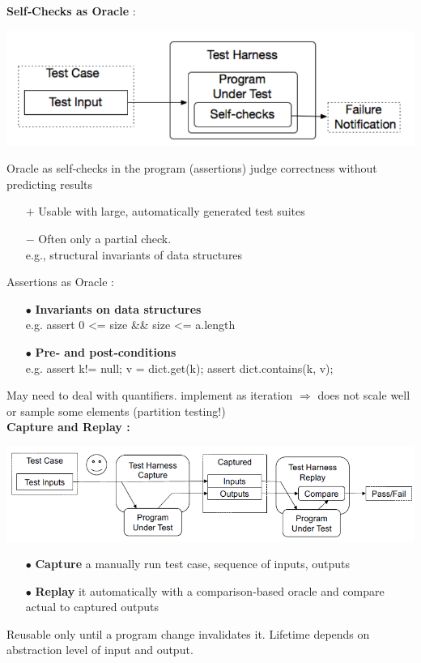 \documentclass{article}
\begin{document}
\begin{multicols}{2}
\noindent \textbf{Self‐Checks
as
Oracle} :


\begin{center}
    \includegraphics[scale=0.4]{image/51.PNG}
\end{center}


\noindent Oracle as self‐checks in the program (assertions) judge correctness without predicting results
\begin{itemize}
    \item [$+$]Usable with large, automatically generated test suites
    \item [$-$]Often only a partial check. \\
    e.g., structural invariants of data structures\\
\end{itemize}

\noindent Assertions as Oracle :
\begin{itemize}
    \item [$\bullet$]\textbf{Invariants on data structures}\\
    e.g. assert 0 <= size \&\& size <= a.length
    \item [$\bullet$]\textbf{Pre‐ and post‐conditions}\\
    e.g. assert k\makebox{ }!= null; v = dict.get(k); assert dict.contains(k, v);
\end{itemize}
\noindent May
need to
deal
with quantifiers. implement as
iteration $\Rightarrow$ does not
scale well
or
sample some elements (partition
testing!)\\

\noindent \textbf{Capture
and
Replay :}
\begin{center}
    \includegraphics[scale=0.45]{image/52.PNG}
\end{center}
\begin{itemize}
    \item [$\bullet$]\textbf{Capture} a
manually
run
test
case,
sequence
of
inputs,
outputs
    \item [$\bullet$]\textbf{Replay} it
automatically
with
a
comparison‐based
oracle and
compare
actual
to
captured
outputs\\
\end{itemize}
Reusable only until a program change invalidates it. Lifetime depends on abstraction level of input and output.
\vfill\null
\end{multicols}
\end{document}

